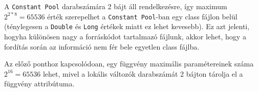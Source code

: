 \begin{compactitem}
 \item A \lstinline{Constant Pool} darabszámára 2 bájt áll rendelkezésre, így maximum $2^{2 * 8} = 65536$ érték szerepelhet a \lstinline{Constant Pool}-ban egy class fájlon belül (ténylegesen a \lstinline{Double} és \lstinline{Long} értékek miatt ez lehet kevesebb). Ez azt jelenti, hogyha különösen nagy a forráskódot tartalmazó fájlunk, akkor lehet, hogy a fordítás során az információ nem fér bele egyetlen class fájlba.
 \item Az előző ponthoz kapcsolódoan, egy függvény maximális paramétereinek száma $2^{16} = 65536$ lehet, mivel a lokális változók darabszámát 2 bájton tárolja el a függvény attribútuma.
\end{compactitem}